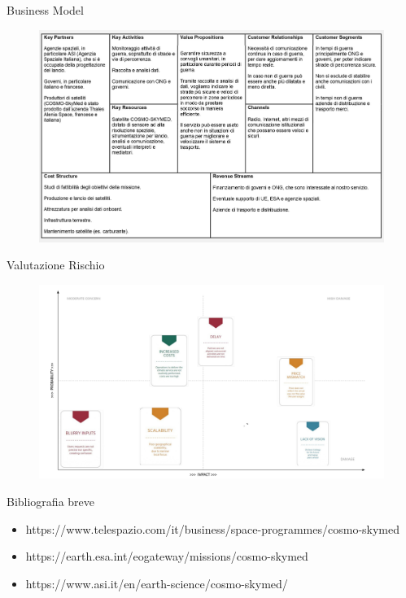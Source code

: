 \documentclass[xcolor=table]{beamer}
\begin{document}
\begin{frame}{Business Model}

\begin{figure}
    \centering
    \includegraphics[width=\textwidth]{business-modeldausare.jpg}
\end{figure}
    
\end{frame}

\begin{frame}{Valutazione Rischio}

\begin{figure}
   \centering
  \includegraphics[width=\textwidth]{Riskdamettere.jpg}
\end{figure}
    
\end{frame}

\begin{frame}{Bibliografia breve}

\begin{itemize}
    \item https://www.telespazio.com/it/business/space-programmes/cosmo-skymed
    \item https://earth.esa.int/eogateway/missions/cosmo-skymed
    \item https://www.asi.it/en/earth-science/cosmo-skymed/
\end{itemize}


    
\end{frame}
\end{document}
